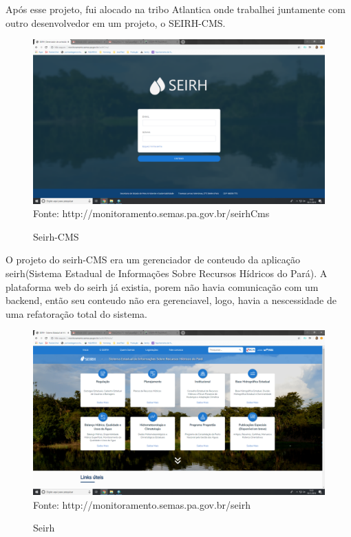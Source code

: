 Após esse projeto, fui alocado na tribo Atlantica onde trabalhei juntamente com outro desenvolvedor em um projeto, o SEIRH-CMS.

\begin{figure}[H]
\centering
\caption{Seirh-CMS} %
\includegraphics[scale=0.22]{seirh-cms}\\  %
{\small Fonte: http://monitoramento.semas.pa.gov.br/seirhCms} %
\label{fig:exemplo} %
\end{figure}

O projeto do seirh-CMS era um gerenciador de conteudo da aplicação seirh(Sistema Estadual de Informações Sobre Recursos Hídricos do Pará).
A plataforma web do seirh já existia, porem não havia comunicação com um backend, então seu conteudo não era gerenciavel, logo, havia a nescessidade de uma refatoração total do sistema.

\begin{figure}[H]
\centering
\caption{Seirh} %
\includegraphics[scale=0.22]{seirh}\\  %
{\small Fonte: http://monitoramento.semas.pa.gov.br/seirh} %
\label{fig:exemplo} %
\end{figure}

